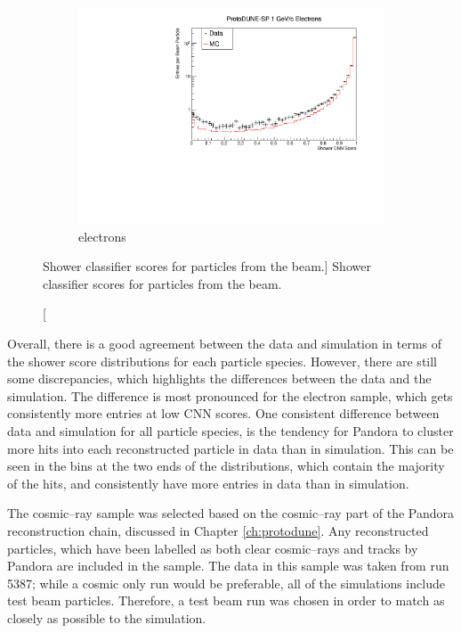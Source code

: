 \begin{figure}
	\begin{subfigure}[b]{0.7\textwidth}
		\centering
		\includegraphics[width=\textwidth]{figures/hit_cnn_electron.pdf}
		\caption {electrons}
		\label{fig:beam_electron_cnn}
	\end{subfigure}

	\caption
	[Shower classifier scores for particles from the \protodune{} beam.]
	{Shower classifier scores for particles from the \protodune{} beam.}

	\label{fig:cnn_scores_beam}

\end{figure}

Overall, there is a good agreement between the data and simulation in terms of
the shower score distributions for each particle species. However, there are
still some discrepancies, which highlights the differences between the data and
the simulation. The difference is most pronounced for the electron sample, which
gets consistently more entries at low CNN scores. One consistent difference
between data and simulation for all particle species, is the tendency for 
Pandora to cluster more hits into each reconstructed particle in data than in 
simulation. This can be seen in the bins at the two ends of the distributions,
which contain the majority of the hits, and consistently have more entries in 
data than in simulation.

The cosmic--ray sample was selected based on the cosmic--ray part of the
Pandora reconstruction chain, discussed in Chapter \ref{ch:protodune}. Any
reconstructed particles, which have been labelled as both clear cosmic--rays
and tracks by Pandora are included in the sample. The data in this sample was
taken from run 5387; while a cosmic only run would be preferable, all of the
\protodune{} simulations include test beam particles. Therefore, a test beam
run was chosen in order to match as closely as possible to the simulation.

